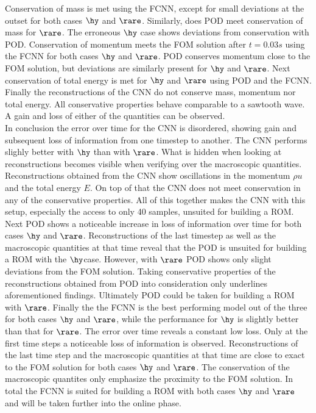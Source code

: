 Conservation of mass is met using the FCNN, except for small deviations at the outset for both cases \(\hy\) and \(\rare\). Similarly, does POD meet conservation of mass for \(\rare\). The erroneous \(\hy\) case shows deviations from conservation with POD. Conservation of momentum meets the FOM solution after \(t=0.03s\) using the FCNN for both cases \(\hy\) and \(\rare\). POD conserves momentum close to the FOM solution, but deviations are similarly present for \(\hy\) and \(\rare\). Next conservation of total energy is met for \(\hy\) and \(\rare\) using POD and the FCNN. Finally the reconstructions of the CNN do not conserve mass, momentum nor total energy. All conservative properties behave comparable to a sawtooth wave. A gain and loss of either of the quantities can be observed.\\
In conclusion the error over time for the CNN is disordered, showing gain and subsequent loss of information from one timestep to another. The CNN performs slighly better with \(\hy\) than with \(\rare\). What is hidden when looking at reconstructions becomes visible when verifying over the macroscopic quantities. Reconstructions obtained from the CNN show oscillations in the momentum \(\rho u\) and the total energy \(E\). On top of that the CNN does not meet conservation in any of the conservative properties. All of this together makes the CNN with this setup, especially the access to only 40 samples, unsuited for building a ROM. Next POD shows a noticeable increase in loss of information over time for both cases \(\hy\) and \(\rare\). Reconstructions of the last timestep as well as the macroscopic quantities at that time reveal that the POD is unsuited for building a ROM with the \(\hy\)case. However, with \(\rare\) POD shows only slight deviations from the FOM solution. Taking conservative properties of the reconstructions obtained from POD into consideration only underlines aforementioned findings. Ultimately POD could be taken for building a ROM with \(\rare\). Finally the the FCNN is the best performing model out of the three for both cases \(\hy\) and \(\rare\), while the performance for \(\hy\) is slightly better than that for \(\rare\). The error over time reveals a constant low loss. Only at the first time steps a noticeable loss of information is observed. Reconstructions of the last time step and the macroscopic quantities at that time are close to exact to the FOM solution for both cases \(\hy\) and \(\rare\). The conservation of the macroscopic quantites only emphasize the proximity to the FOM solution. In total the FCNN is suited for building a ROM with both cases \(\hy\) and \(\rare\) and will be taken further into the online phase.\\
